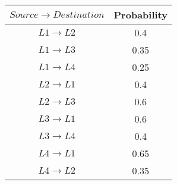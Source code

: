 \documentclass[12pt, letterpaper]{article}
\begin{document}
\begin{center}
    \begin{tabular}{|c|c|} 
    \hline
    $Source \rightarrow Destination$ & Probability\\ 
    \hline
    $L1 \rightarrow L2$ & 0.4 \\
    \hline
    $L1 \rightarrow L3$ & 0.35 \\
    \hline
    $L1 \rightarrow L4$ & 0.25 \\
    \hline
    $L2 \rightarrow L1$ & 0.4 \\
    \hline
    $L2 \rightarrow L3$ & 0.6 \\
    \hline
    $L3 \rightarrow L1$ & 0.6 \\
    \hline
    $L3 \rightarrow L4$ & 0.4 \\
    \hline
    $L4 \rightarrow L1$ & 0.65 \\
    \hline
    $L4 \rightarrow L2$ & 0.35 \\
    \hline
    \end{tabular}    
\end{center}
\end{document}
